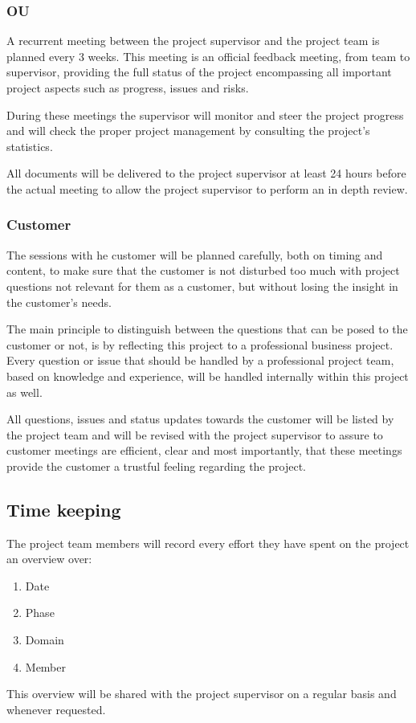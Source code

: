 \subsubsection{OU}
%
A recurrent meeting between the project supervisor and the project team is planned every 3 weeks.
This meeting is an official feedback meeting, from team to supervisor, providing the full status of the project encompassing all important project aspects such as progress, issues and risks.

During these meetings the supervisor will monitor and steer the project progress and will check the proper project management by consulting the project's statistics.

All documents will be delivered to the project supervisor at least 24 hours before the actual meeting to allow the project supervisor to perform an in depth review.

\subsubsection{Customer}
The sessions with he customer will be planned carefully, both on timing and content, to make sure that the customer is not disturbed too much with project questions not relevant for them as a customer, but without losing the insight in the customer's needs.

The main principle to distinguish between the questions that can be posed to the customer or not, is by reflecting this project to a professional business project.
Every question or issue that should be handled by a professional project team, based on knowledge and experience, will be handled internally within this project as well.

All questions, issues and status updates towards the customer will be listed by the project team and will be revised with the project supervisor to assure to customer meetings are efficient, clear and most importantly, that these meetings provide the customer a trustful feeling regarding the project.

\subsection{Time keeping}
The project team members will record every effort they have spent on the project an overview over:
\begin{enumerate}
	\item Date
	\item Phase
	\item Domain
	\item Member
\end {enumerate}
This overview will be shared with the project supervisor on a regular basis and whenever requested.

